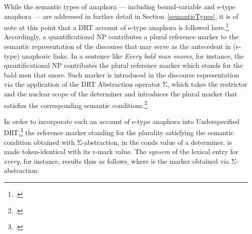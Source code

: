 \documentclass[output=paper
	        ,collection
	        ,collectionchapter
 	        ,biblatex
                ,babelshorthands
                ,newtxmath
                ,draftmode
                ,colorlinks, citecolor=brown
]{langscibook}
\begin{document}
\begin{paperappendix}
While the semantic types of anaphora --- including bound-variable and e-type anaphora --- are addressed in further detail in Section~\ref{semanticTypes},
it is of note at this point that a DRT account of e-type anaphora is followed here.\footnote{
\citep[\page 311ff]{kamp:drt93}.} 
Accordingly, a quantificational NP contributes a plural reference marker to the
semantic representation of the discourse that may serve as the antecedent in (e-type) 
anaphoric links. In a sentence like {\em Every bald man snores}, for instance,
the quantificational NP contributes 
the plural reference marker which stands for the bald
men that snore. Such marker is introduced in the discourse representation
via the application of the DRT Abstraction operator Σ, which
takes the restrictor and the nuclear scope of the determiner and
introduces the plural marker that satisfies the corresponding
semantic conditions.\footnote{
\citep[]{kamp:drt93}.}

In order to incorporate such an account of e-type anaphora
into Underspecified DRT,\footnote{
\citep{frank:sem95}.} 
the reference marker standing for the plurality
satisfying the semantic condition obtained with  
\mbox{Σ-abstraction}, in the {\sc conds} value of a determiner, 
is made token-identical with its {\sc r-mark} value. The {\em synsem} of the
lexical  entry for {\em every}, for instance, results thus as follows, where
 is the marker obtained
via 
\mbox{Σ-abstraction}:
% 
\\
\avmfont{\sc}
\avmvalfont{\it}
\avmsortfont{\it}
\begin{center}
\begin{avm}


\end{avm}
\end{center}
\end{paperappendix}
\end{document}

